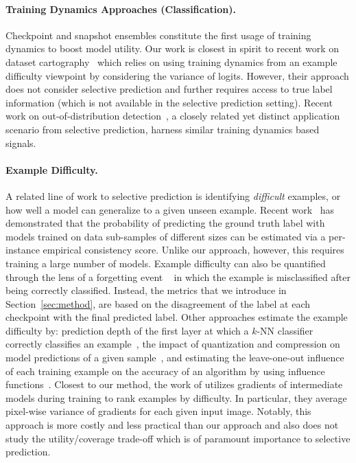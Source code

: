\paragraph{Training Dynamics Approaches (Classification).} Checkpoint and snapshot ensembles \citep{huang2017snapshot, chen2017checkpoint} constitute the first usage of training dynamics to boost model utility. Our work is closest in spirit to recent work on dataset cartography~\citep{swayamdipta2020dataset} which relies on using training dynamics from an example difficulty viewpoint by considering the variance of logits. However, their approach does not consider selective prediction and further requires access to true label information (which is not available in the selective prediction setting). Recent work on out-of-distribution detection~\citep{adila2022understanding}, a closely related yet distinct application scenario from selective prediction, harness similar training dynamics based signals.


\paragraph{Example Difficulty.}
\label{sec:example_diff}

A related line of work to selective prediction is identifying \emph{difficult} examples, or how well a model can generalize to a given unseen example. Recent work~\cite{jiang2020characterizing} has demonstrated that the probability of predicting the ground truth label with models trained on data sub-samples of different sizes can be estimated via a per-instance empirical consistency score. Unlike our approach, however, this requires training a large number of models. 
Example difficulty can also be quantified through the lens of a forgetting event ~\cite{toneva2018empirical} in which the example is misclassified after being correctly classified. Instead, the metrics that we introduce in Section~\ref{sec:method}, are based on the disagreement of the label at each checkpoint with the final predicted label. Other approaches estimate the example difficulty by: 
prediction depth of the first layer at which a $k$-NN classifier correctly classifies an example~\citep{baldock2021deep}, the impact of quantization and compression on model predictions of a given sample~\citep{hooker2019compressed}, and estimating the leave-one-out influence of each training example on the accuracy of an algorithm by using influence functions~\citep{feldman2020neural}. 
Closest to our method, the work of \cite{agarwal2020estimating} utilizes gradients of intermediate models during training to rank examples by  difficulty. In particular, they average pixel-wise variance of gradients for each given input image. 
Notably, this approach is more costly and less practical than our approach and also does not study the utility/coverage trade-off which is of paramount importance to selective prediction.

